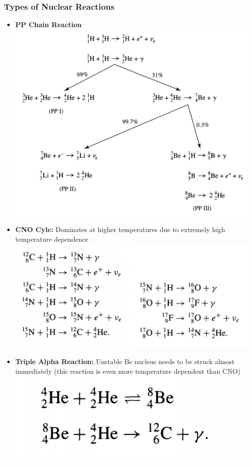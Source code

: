 \documentclass[12pt]{article}
\begin{document}
\subsubsection{Types of Nuclear Reactions}
\begin{itemize}
    \item \textbf{PP Chain Reaction}\newline\includegraphics[scale=0.4]{Figures/PPChain.png}
    \item \textbf{CNO Cyle:} Dominates at higher temperatures due to extremely high temperature dependence \newline\includegraphics[scale=0.4]{Figures/CNO.png} 
    \item \textbf{Triple Alpha Reaction:} Unstable Be nucleus needs to be struck almost immediately (this reaction is even more temperature dependent than CNO)\newline\includegraphics[scale=0.5]{Figures/TripleAlpha.png}

\end{itemize}
\end{document}
